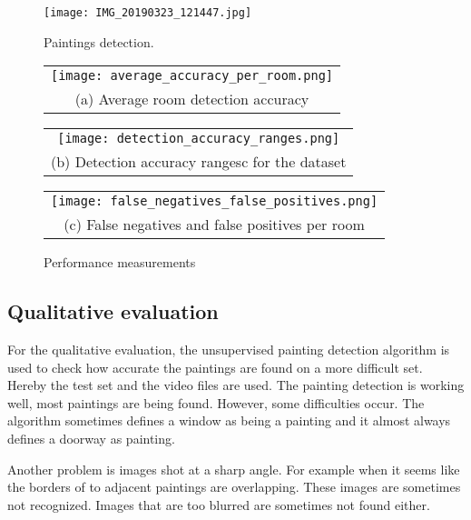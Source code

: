 \begin{figure}[h]
    \texttt{[image: IMG\_20190323\_121447.jpg]}
    \caption{Paintings detection.}
    \label{fig:paiting_detection_with_ground_truth}
\end{figure}

\begin{figure}
    \centering
    \begin{tabular}{@{}c@{}}
        \texttt{[image: average\_accuracy\_per\_room.png]} \\[\abovecaptionskip]
        \small (a) Average room detection accuracy
    \end{tabular}

    \vspace{\floatsep}

    \begin{tabular}{@{}c@{}}
        \texttt{[image: detection\_accuracy\_ranges.png]} \\[\abovecaptionskip]
        \small (b) Detection accuracy rangesc for the dataset
    \end{tabular}

    \begin{tabular}{@{}c@{}}
        \texttt{[image: false\_negatives\_false\_positives.png]} \\[\abovecaptionskip]
        \small (c) False negatives and false positives per room
    \end{tabular}

    \caption{Performance measurements}
    \label{fig:performance-measurements}
\end{figure}

\subsection{Qualitative evaluation}
For the qualitative evaluation, the unsupervised painting detection algorithm is used to check how accurate the paintings are found on a more difficult set. Hereby the test set and the video files are used. The painting detection is working well, most paintings are being found. However, some difficulties occur. The algorithm sometimes defines a window as being a painting and it almost always defines a doorway as painting.

Another problem is images shot at a sharp angle. For example when it seems like the borders of to adjacent paintings are overlapping. These images are sometimes not recognized. Images that are too blurred are sometimes not found either.
